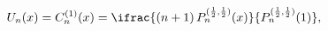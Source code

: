 \[\mathop{U_{n}\/}\nolimits\!\left(x\right)=\mathop{C^{(1)}_{n}\/}\nolimits\!%
\left(x\right)=\ifrac{(n+1)\mathop{P^{(\frac{1}{2},\frac{1}{2})}_{n}\/}%
\nolimits\!\left(x\right)}{\mathop{P^{(\frac{1}{2},\frac{1}{2})}_{n}\/}%
\nolimits\!\left(1\right)},\]